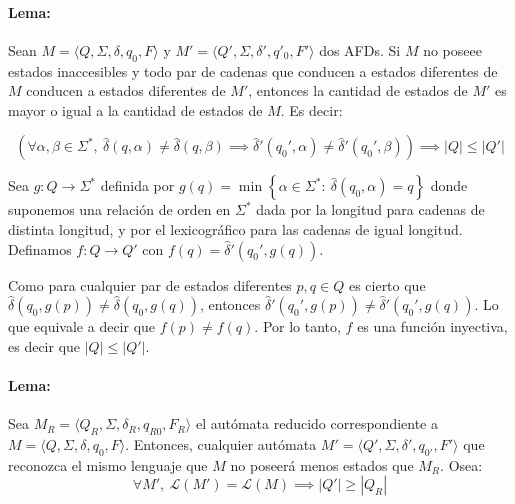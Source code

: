 \paragraph{Lema:} Sean \(M=\langle Q, \Sigma, \delta, q_0, F\rangle\) y \(M'=\langle Q', \Sigma, \delta', q'_0, F'\rangle\) dos AFDs. Si \(M\) no poseee estados inaccesibles y todo par de cadenas que conducen a estados diferentes de \(M\) conducen a estados diferentes de \(M'\), entonces la cantidad de estados de \(M'\) es mayor o igual a la cantidad de estados de \(M\). Es decir:

\[
  \left(
  \forall\alpha,\beta\in\Sigma^*,~\hat\delta(q, \alpha) \neq \hat\delta(q, \beta) \implies \hat\delta'(q_0', \alpha) \neq \hat\delta'(q_0', \beta)
  \right) \implies |Q|\leq |Q'|
\]

\begin{demo}[0.8\textwidth]
  Sea \(g:Q\to\Sigma^*\) definida por \(g(q) = \min\left\{\alpha\in\Sigma^*:~\hat\delta(q_0,\alpha) = q\right\}\) donde suponemos una relación de orden en \(\Sigma^*\) dada por la longitud para cadenas de distinta longitud, y por el lexicográfico para las cadenas de igual longitud. Definamos \(f: Q\to Q'\) con \(f(q)=\hat\delta'(q_0', g(q))\).

  Como para cualquier par de estados diferentes \(p,q\in Q\) es cierto que \(\hat\delta(q_0, g(p))\neq\hat\delta(q_0, g(q))\), entonces \(\hat\delta'(q_0', g(p))\neq\hat\delta'(q_0', g(q))\). Lo que equivale a decir que \(f(p)\neq f(q)\). Por lo tanto, \(f\) es una función inyectiva, es decir que \(|Q|\leq |Q'|\).
\end{demo}

\paragraph{Lema:} Sea \(M_R = \langle Q_R, \Sigma, \delta_R, q_{R0}, F_R\rangle\) el autómata reducido correspondiente a \\ \(M = \langle Q, \Sigma, \delta, q_0, F\rangle\). Entonces, cualquier autómata \(M' = \langle Q', \Sigma, \delta', q_{0'}, F'\rangle\) que reconozca el mismo lenguaje que \(M\) no poseerá menos estados que \(M_R\). Osea:
\[
  \forall M',~\mathcal{L} (M') = \mathcal{L} (M) \implies |Q'| \geq |Q_R|
\]

